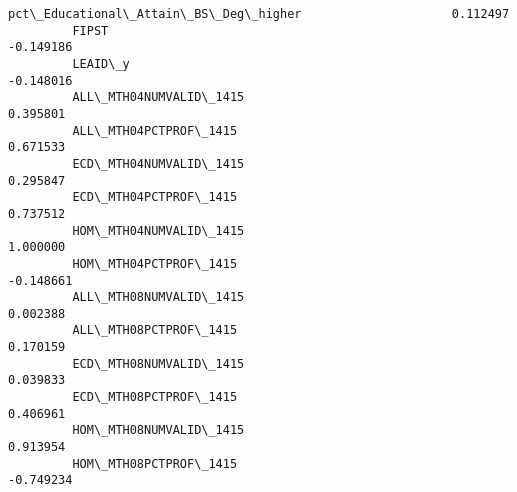 \documentclass[11pt]{article}
\begin{document}
\begin{Verbatim}[commandchars=\\\{\}]
         pct\_Educational\_Attain\_BS\_Deg\_higher                     0.112497   
         FIPST                                                   -0.149186   
         LEAID\_y                                                 -0.148016   
         ALL\_MTH04NUMVALID\_1415                                   0.395801   
         ALL\_MTH04PCTPROF\_1415                                    0.671533   
         ECD\_MTH04NUMVALID\_1415                                   0.295847   
         ECD\_MTH04PCTPROF\_1415                                    0.737512   
         HOM\_MTH04NUMVALID\_1415                                   1.000000   
         HOM\_MTH04PCTPROF\_1415                                   -0.148661   
         ALL\_MTH08NUMVALID\_1415                                   0.002388   
         ALL\_MTH08PCTPROF\_1415                                    0.170159   
         ECD\_MTH08NUMVALID\_1415                                   0.039833   
         ECD\_MTH08PCTPROF\_1415                                    0.406961   
         HOM\_MTH08NUMVALID\_1415                                   0.913954   
         HOM\_MTH08PCTPROF\_1415                                   -0.749234   
         

\end{Verbatim}
\end{document}
